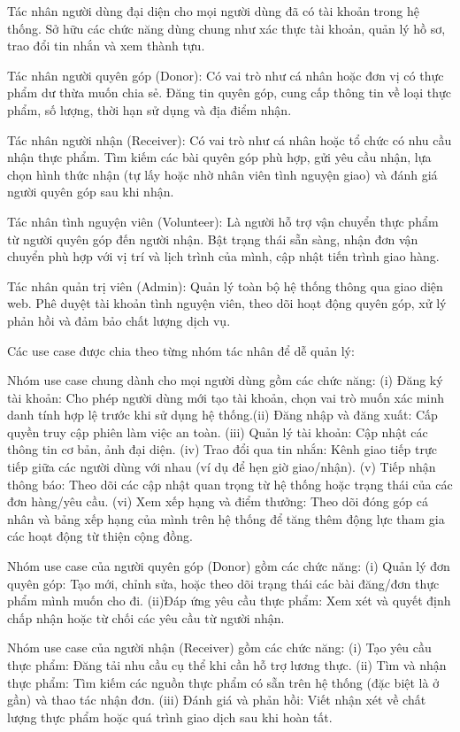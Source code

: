 \documentclass[../main.tex]{subfiles}%
\begin{document}
Tác nhân người dùng đại diện cho mọi người dùng đã có tài khoản trong hệ thống. Sở hữu các chức năng dùng chung như xác thực tài khoản, quản lý hồ sơ, trao đổi tin nhắn và xem thành tựu.

Tác nhân người quyên góp (Donor): Có vai trò như cá nhân hoặc đơn vị có thực phẩm dư thừa muốn chia sẻ. Đăng tin quyên góp, cung cấp thông tin về loại thực phẩm, số lượng, thời hạn sử dụng và địa điểm nhận.

Tác nhân người nhận (Receiver): Có vai trò như cá nhân hoặc tổ chức có nhu cầu nhận thực phẩm. Tìm kiếm các bài quyên góp phù hợp, gửi yêu cầu nhận, lựa chọn hình thức nhận (tự lấy hoặc nhờ nhân viên tình nguyện giao) và đánh giá người quyên góp sau khi nhận.

Tác nhân tình nguyện viên (Volunteer): Là người hỗ trợ vận chuyển thực phẩm từ người quyên góp đến người nhận. Bật trạng thái sẵn sàng, nhận đơn vận chuyển phù hợp với vị trí và lịch trình của mình, cập nhật tiến trình giao hàng.

Tác nhân quản trị viên (Admin): Quản lý toàn bộ hệ thống thông qua giao diện web. Phê duyệt tài khoản tình nguyện viên, theo dõi hoạt động quyên góp, xử lý phản hồi và đảm bảo chất lượng dịch vụ.

Các use case được chia theo từng nhóm tác nhân để dễ quản lý:

Nhóm use case chung dành cho mọi người dùng gồm các chức năng: (i) Đăng ký tài khoản: Cho phép người dùng mới tạo tài khoản, chọn vai trò muốn xác minh danh tính hợp lệ trước khi sử dụng hệ thống.(ii) Đăng nhập và đăng xuất: Cấp quyền truy cập phiên làm việc an toàn. (iii) Quản lý tài khoản: Cập nhật các thông tin cơ bản, ảnh đại diện. (iv) Trao đổi qua tin nhắn: Kênh giao tiếp trực tiếp giữa các người dùng với nhau (ví dụ để hẹn giờ giao/nhận). (v) Tiếp nhận thông báo: Theo dõi các cập nhật quan trọng từ hệ thống hoặc trạng thái của các đơn hàng/yêu cầu. (vi) Xem xếp hạng và điểm thưởng: Theo dõi đóng góp cá nhân và bảng xếp hạng của mình trên hệ thống để tăng thêm động lực tham gia các hoạt động từ thiện cộng đồng.

Nhóm use case của người quyên góp (Donor) gồm các chức năng: (i) Quản lý đơn quyên góp: Tạo mới, chỉnh sửa, hoặc theo dõi trạng thái các bài đăng/đơn thực phẩm mình muốn cho đi. (ii)Đáp ứng yêu cầu thực phẩm: Xem xét và quyết định chấp nhận hoặc từ chối các yêu cầu từ người nhận.

Nhóm use case của người nhận (Receiver) gồm các chức năng: (i) Tạo yêu cầu thực phẩm: Đăng tải nhu cầu cụ thể khi cần hỗ trợ lương thực. (ii) Tìm và nhận thực phẩm: Tìm kiếm các nguồn thực phẩm có sẵn trên hệ thống (đặc biệt là ở gần) và thao tác nhận đơn. (iii) Đánh giá và phản hồi: Viết nhận xét về chất lượng thực phẩm hoặc quá trình giao dịch sau khi hoàn tất.
\end{document}
